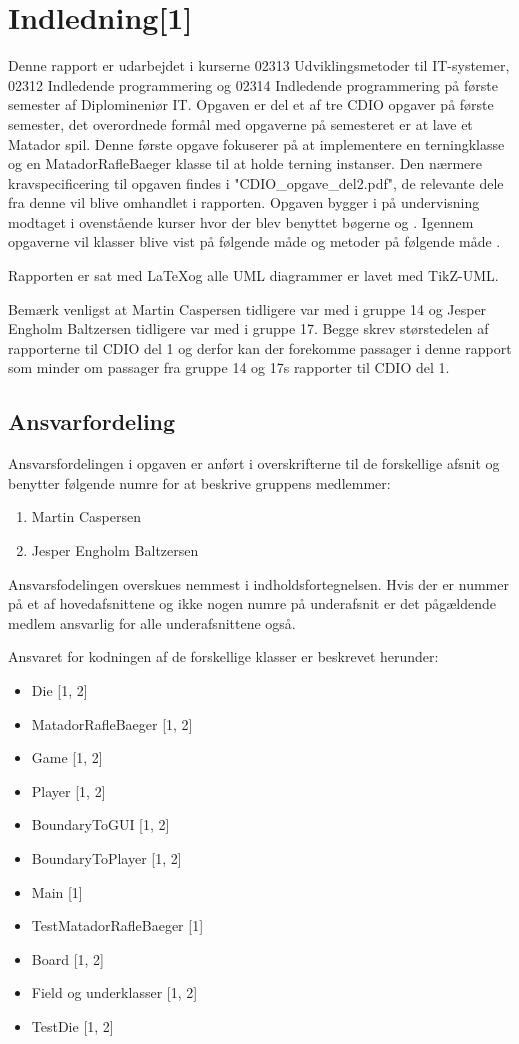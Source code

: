 \chapter{Indledning[1]}\label{chap:indledning}
Denne rapport er udarbejdet i kurserne 02313 Udviklingsmetoder til IT-systemer, 02312 Indledende programmering og 02314 Indledende programmering på første semester af Diplomineniør IT. Opgaven er del et af tre CDIO opgaver på første semester, det overordnede formål med opgaverne på semesteret er at lave et Matador spil. Denne første opgave fokuserer på at implementere en terningklasse og en MatadorRafleBaeger klasse til at holde terning instanser. Den nærmere kravspecificering til opgaven findes i "CDIO\_opgave\_del2.pdf"\cite{CDIOdel2}, de relevante dele fra denne vil blive omhandlet i rapporten. Opgaven bygger i på undervisning modtaget i ovenstående kurser hvor der blev benyttet bøgerne \cite{umlbook} og \cite{javabook}. Igennem opgaverne vil klasser blive vist på følgende måde  og metoder på følgende måde .

Rapporten er sat med \LaTeX og alle UML diagrammer er lavet med TikZ-UML.

Bemærk venligst at Martin Caspersen tidligere var med i gruppe 14 og Jesper Engholm Baltzersen tidligere var med i gruppe 17. Begge skrev størstedelen af rapporterne til CDIO del 1 og derfor kan der forekomme passager i denne rapport som minder om passager fra gruppe 14 og 17s rapporter til CDIO del 1.

\section{Ansvarfordeling}\label{sec:indledning:ansvarsfordeling}

Ansvarsfordelingen i opgaven er anført i overskrifterne til de forskellige afsnit og benytter følgende numre for at beskrive gruppens medlemmer:
\begin{enumerate}
\item Martin Caspersen
\item Jesper Engholm Baltzersen
\end{enumerate}
Ansvarsfodelingen overskues nemmest i indholdsfortegnelsen. Hvis der er nummer på et af hovedafsnittene og ikke nogen numre på underafsnit er det pågældende medlem ansvarlig for alle underafsnittene også.

Ansvaret for kodningen af de forskellige klasser er beskrevet herunder:
\begin{itemize}
\item Die [1, 2]
\item MatadorRafleBaeger [1, 2]
\item Game [1, 2]
\item Player [1, 2]
\item BoundaryToGUI [1, 2]
\item BoundaryToPlayer [1, 2]
\item Main [1]
\item TestMatadorRafleBaeger [1]
\item Board [1, 2]
\item Field og underklasser [1, 2]
\item TestDie [1, 2]
\end{itemize}
